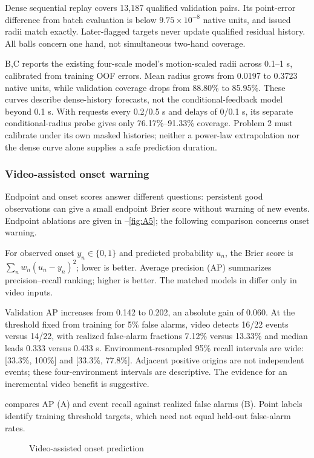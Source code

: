 Dense sequential replay covers 13,187 qualified validation pairs. Its point-error difference from batch evaluation is below $9.75\times10^{-8}$ native units, and issued radii match exactly. Later-flagged targets never update qualified residual history. All balls concern one hand, not simultaneous two-hand coverage.

B,C reports the existing four-scale model's motion-scaled radii across 0.1--1 s, calibrated from training OOF errors. Mean radius grows from 0.0197 to 0.3723 native units, while validation coverage drops from 88.80\% to 85.95\%. These curves describe dense-history forecasts, not the conditional-feedback model beyond 0.1 s. With requests every 0.2/0.5 s and delays of 0/0.1 s, its separate conditional-radius probe gives only 76.17\%--91.33\% coverage. Problem 2 must calibrate under its own masked histories; neither a power-law extrapolation nor the dense curve alone supplies a safe prediction duration.
\FloatBarrier

\subsubsection{Video-assisted onset warning}
Endpoint and onset scores answer different questions: persistent good observations can give a small endpoint Brier score without warning of new events. Endpoint ablations are given in --\ref{fig:A5}; the following comparison concerns onset warning.

For observed onset $y_n\in\{0,1\}$ and predicted probability $u_n$, the Brier score is $\sum_n w_n(u_n-y_n)^2$; lower is better. Average precision (AP) summarizes precision--recall ranking; higher is better. The matched models in  differ only in video inputs.


Validation AP increases from 0.142 to 0.202, an absolute gain of 0.060. At the threshold fixed from training for 5\% false alarms, video detects 16/22 events versus 14/22, with realized false-alarm fractions 7.12\% versus 13.33\% and median leads 0.333 versus 0.433 s. Environment-resampled 95\% recall intervals are wide: [33.3\%, 100\%] and [33.3\%, 77.8\%]. Adjacent positive origins are not independent events; these four-environment intervals are descriptive. The evidence for an incremental video benefit is suggestive.

 compares AP (A) and event recall against realized false alarms (B). Point labels identify training threshold targets, which need not equal held-out false-alarm rates.
\begin{figure}[!htbp]
\centering
{}
\caption{Video-assisted onset prediction}
\label{fig:onset}
\end{figure}

